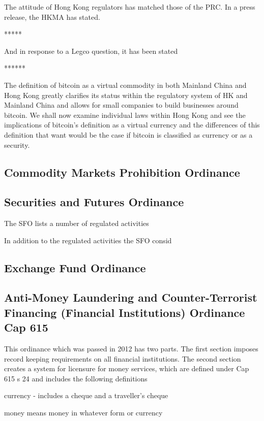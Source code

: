 The attitude of Hong Kong regulators has matched those of the PRC.  In
a press release, the HKMA has stated.

*****

And in response to a Legco question, it has been stated

******

The definition of bitcoin as a virtual commodity in both Mainland
China and Hong Kong greatly clarifies its status within the regulatory
system of HK and Mainland China and allows for small companies to
build businesses around bitcoin.  We shall now examine individual laws
within Hong Kong and see the implications of bitcoin's definition as a
virtual currency and the differences of this definition that want
would be the case if bitcoin is classified as currency or as a security.

\subsection{Commodity Markets Prohibition Ordinance}


\subsection{Securities and Futures Ordinance}

The SFO lists a number of regulated activities

In addition to the regulated activities the SFO consid



\subsection{Exchange Fund Ordinance}

\subsection{Anti-Money Laundering and Counter-Terrorist Financing
(Financial Institutions) Ordinance Cap 615}

This ordinance which was passed in 2012 has two parts.  The first
section imposes record keeping requirements on all financial
institutions.  The second section creates a system for licensure for
money services, which are defined under Cap 615 s 24 and includes the
following definitions

currency - includes a cheque and a traveller's cheque

money means money in whatever form or currency

